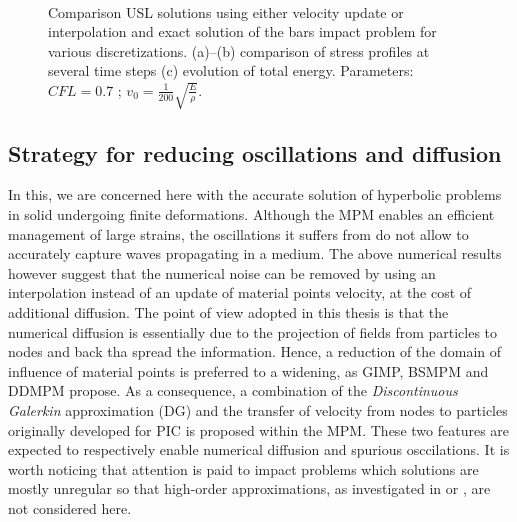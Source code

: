 \begin{figure}[h!]
  \centering
  {  \label{subfig:mpm_diffusion_10}}
  {  \label{subfig:mpm_diffusion_25}}\\
  {  \label{subfig:mpm_energies}}
  \caption{Comparison USL solutions using either velocity update or interpolation and exact solution of the bars impact problem for various discretizations. (a)--(b) comparison of stress profiles at several time steps (c) evolution of total energy. Parameters: $CFL=0.7$ ; $v_0=\frac{1}{200}\sqrt{\frac{E}{\rho}}$.}
  \label{fig:mpm_diffusion}
\end{figure}

\subsection{Strategy for reducing oscillations and diffusion}
In this, we are concerned here with the accurate solution of hyperbolic problems in solid undergoing finite deformations. Although the MPM enables an efficient management of large strains, the oscillations it suffers from do not allow to accurately capture waves propagating in a medium. The above numerical results however suggest that the numerical noise can be removed by using an interpolation instead of an update of material points velocity, at the cost of additional diffusion. The point of view adopted in this thesis is that the numerical diffusion is essentially due to the projection of fields from particles to nodes and back tha spread the information. Hence, a reduction of the domain of influence of material points is preferred to a widening, as GIMP, BSMPM and DDMPM propose. 
As a consequence, a combination of the  \textit{Discontinuous Galerkin} approximation (DG) and the transfer of velocity from nodes to particles originally developed for PIC is proposed within the MPM. These two features are expected to respectively enable numerical diffusion and spurious osccilations. It is worth noticing that attention is paid to impact problems which solutions are mostly unregular so that high-order approximations, as investigated in \cite{MPM_BSpline2} or \cite{BsplineMPM}, are not considered here. 


